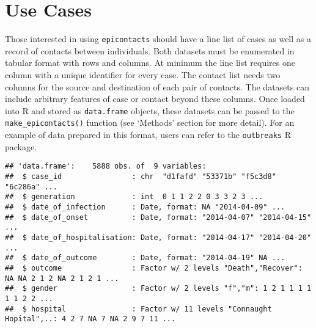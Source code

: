 \documentclass[9pt,a4paper,]{extarticle}
\newenvironment{Shaded}{\begin{snugshade}}{\end{snugshade}}
\newcommand{\KeywordTok}[1]{\textcolor[rgb]{0.13,0.29,0.53}{\textbf{#1}}}
\newcommand{\CommentTok}[1]{\textcolor[rgb]{0.56,0.35,0.01}{\textit{#1}}}
\newcommand{\OperatorTok}[1]{\textcolor[rgb]{0.81,0.36,0.00}{\textbf{#1}}}
\newcommand{\NormalTok}[1]{#1}
\theoremstyle{definition}
\theoremstyle{definition}
\theoremstyle{definition}
\theoremstyle{remark}
\begin{document}
\section{Use Cases}\label{use-cases}

Those interested in using \texttt{epicontacts} should have a line list of cases as well as a record of contacts between individuals. Both datasets must be enumerated in tabular format with rows and columns. At minimum the line list requires one column with a unique identifier for every case. The contact list needs two columns for the source and destination of each pair of contacts. The datasets can include arbitrary features of case or contact beyond these columns. Once loaded into R and stored as \texttt{data.frame} objects, these datasets can be passed to the \texttt{make\_epicontacts()} function (see `Methods' section for more detail). For an example of data prepared in this format, users can refer to the \texttt{outbreaks} R package.

\begin{Shaded}
\end{Shaded}

\begin{verbatim}
## 'data.frame':    5888 obs. of  9 variables:
##  $ case_id                : chr  "d1fafd" "53371b" "f5c3d8" "6c286a" ...
##  $ generation             : int  0 1 1 2 2 0 3 3 2 3 ...
##  $ date_of_infection      : Date, format: NA "2014-04-09" ...
##  $ date_of_onset          : Date, format: "2014-04-07" "2014-04-15" ...
##  $ date_of_hospitalisation: Date, format: "2014-04-17" "2014-04-20" ...
##  $ date_of_outcome        : Date, format: "2014-04-19" NA ...
##  $ outcome                : Factor w/ 2 levels "Death","Recover": NA NA 2 1 2 NA 2 1 2 1 ...
##  $ gender                 : Factor w/ 2 levels "f","m": 1 2 1 1 1 1 1 1 2 2 ...
##  $ hospital               : Factor w/ 11 levels "Connaught Hopital",..: 4 2 7 NA 7 NA 2 9 7 11 ...
\end{verbatim}

\begin{Shaded}
\end{Shaded}
\end{document}
